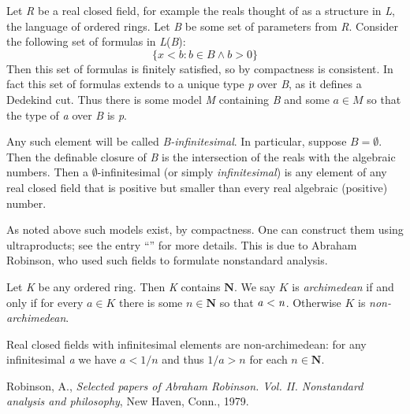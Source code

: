 \documentclass[12pt]{article}
\newcommand{\fm}[1]{{\it #1}}
\begin{document}
Let \fm{R} be a real closed field, for example the reals thought of as a
structure in \fm{L}, the language of ordered rings.  Let \fm{B} be some set
of parameters from \fm{R}. Consider the following set of formulas in
\fm{L}(\fm{B}):
\[
  \{ x<b: b \in B \land b>0\}
\]
Then this set of formulas is finitely satisfied, so by compactness is
consistent.  In fact this set of formulas extends to a unique type \fm{p}
over \fm{B}, as it defines a Dedekind cut.  Thus there is some model \fm{M}
containing \fm{B} and some $a \in M$ so that the type of \fm{a} over \fm{B} is
\fm{p}.

Any such element will be called \emph{B-infinitesimal}.  In
particular, suppose $B=\emptyset$.  Then the definable closure of
\fm{B} is the intersection of the reals with the algebraic numbers.
Then a $\emptyset$-infinitesimal (or simply \emph{infinitesimal}) is
any element of any real closed field that is positive but smaller than
every real algebraic (positive) number.

As noted above such models exist, by compactness. One can construct
them using ultraproducts; see the entry ``'' for more
details.  This is due to
Abraham Robinson, who used such fields to formulate nonstandard
analysis.

Let \fm{K} be any ordered ring.  Then \fm{K} contains $\mathbf{N}$.
We say $K$ is \emph{archimedean} if and only if for every $a \in K$
there is some $n \in \mathbf{N}$ so that $\fm{a} < \fm{n}$.  Otherwise
$K$ is \emph{non-archimedean}.

Real closed fields with infinitesimal elements are non-archimedean:
for any infinitesimal \fm{a} we have $a<1/n$ and thus $1/a>n$ for each
$n \in \mathbf{N}$.

\begin{thebibliography}{9}
Robinson, A., \emph{Selected papers of Abraham
Robinson. Vol. II. Nonstandard analysis and philosophy}, New Haven,
Conn., 1979.
\end{thebibliography}


\end{document}
